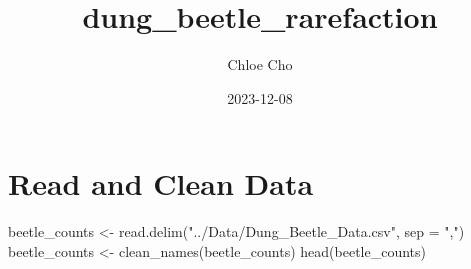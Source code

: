 \documentclass[
]{article}
\title{dung\_beetle\_rarefaction}
\author{Chloe Cho}
\date{2023-12-08}
\newenvironment{Shaded}{\begin{snugshade}}{\end{snugshade}}
\newcommand{\AttributeTok}[1]{\textcolor[rgb]{0.77,0.63,0.00}{#1}}
\newcommand{\FunctionTok}[1]{\textcolor[rgb]{0.00,0.00,0.00}{#1}}
\newcommand{\NormalTok}[1]{#1}
\newcommand{\OtherTok}[1]{\textcolor[rgb]{0.56,0.35,0.01}{#1}}
\newcommand{\StringTok}[1]{\textcolor[rgb]{0.31,0.60,0.02}{#1}}
\begin{document}
\maketitle

\hypertarget{read-and-clean-data}{%
\section{Read and Clean Data}\label{read-and-clean-data}}

\begin{Shaded}
\begin{Highlighting}[]
\NormalTok{beetle\_counts }\OtherTok{\textless{}{-}} \FunctionTok{read.delim}\NormalTok{(}\StringTok{"../Data/Dung\_Beetle\_Data.csv"}\NormalTok{, }\AttributeTok{sep =} \StringTok{","}\NormalTok{)}
\NormalTok{beetle\_counts }\OtherTok{\textless{}{-}} \FunctionTok{clean\_names}\NormalTok{(beetle\_counts)}
\FunctionTok{head}\NormalTok{(beetle\_counts)}
\end{Highlighting}
\end{Shaded}
\end{document}

